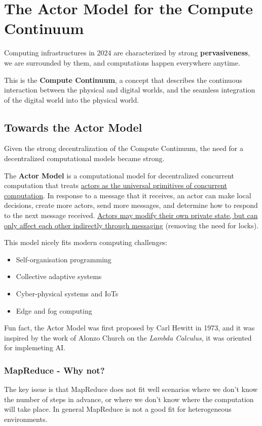 \chapter{The Actor Model for the Compute Continuum}
\label{chap:actor_model}

Computing infrastructures in 2024 are characterized by strong \textbf{pervasiveness}, we are surrounded by them, and computations happen everywhere anytime.

This is the \textbf{Compute Continuum}, a concept that describes the continuous interaction between the physical and digital worlds, and the seamless integration of the digital world into the physical world.

\section{Towards the Actor Model}

Given the strong decentralization of the Compute Continuum, the need for a decentralized computational models became strong.

The \textbf{Actor Model} is a computational model for decentralized concurrent computation that treats \ul{actors as the universal primitives of concurrent computation}. 
In response to a message that it receives, an actor can make local decisions, create more actors, send more messages, and determine how to respond to the next message received. \ul{Actors may modify their own private state, but can only affect each other indirectly through messaging} (removing the need for locks).

{This model nicely fits modern computing challenges:\ns
\begin{itemize}
   \item Self-organisation programming
   \item Collective adaptive systems
   \item Cyber-physical systems and IoTs
   \item Edge and fog computing
\end{itemize}}

Fun fact, the Actor Model was first proposed by Carl Hewitt in 1973, and it was inspired by the work of Alonzo Church on the \textit{Lambda Calculus}, it was oriented for implemeting AI.

\subsection{MapReduce - Why not?}
The key issue is that MapReduce does not fit well scenarios where we don't know the number of steps in advance, or where we don't know where the computation will take place.
In general MapReduce is not a good fit for heterogeneous environments.


